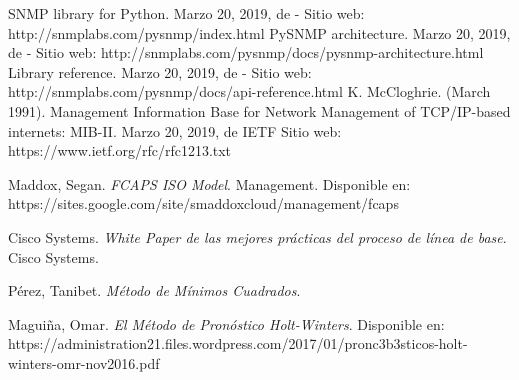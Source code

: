 {}
\begin{thebibliography}{99}
 SNMP library for Python. Marzo 20, 2019, de - Sitio web: http://snmplabs.com/pysnmp/index.html
 PySNMP architecture. Marzo 20, 2019, de - Sitio web: http://snmplabs.com/pysnmp/docs/pysnmp-architecture.html
 Library reference. Marzo 20, 2019, de - Sitio web: http://snmplabs.com/pysnmp/docs/api-reference.html
 K. McCloghrie. (March 1991). Management Information Base for Network Management of TCP/IP-based internets: MIB-II. Marzo 20, 2019, de IETF Sitio web: https://www.ietf.org/rfc/rfc1213.txt

Maddox, Segan. \emph{FCAPS ISO Model}. Management. Disponible en: https://sites.google.com/site/smaddoxcloud/management/fcaps

Cisco Systems. \emph{White Paper de las mejores prácticas del proceso de línea de base}. Cisco Systems.

Pérez, Tanibet. \emph{Método de Mínimos Cuadrados}.

Maguiña, Omar. \emph{El Método de Pronóstico Holt-Winters}. Disponible en: https://administration21.files.wordpress.com/2017/01/pronc3b3sticos-holt-winters-omr-nov2016.pdf
\end{thebibliography}